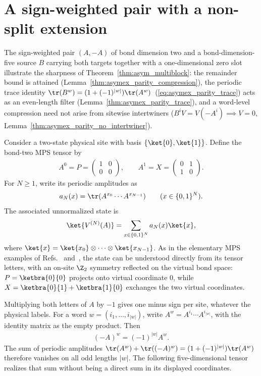 \section{A sign-weighted pair with a non-split extension}%
\label{sec:asymex_parity}

The sign-weighted pair $(A,-A)$ of bond dimension two and a bond-dimension-five
source $B$ carrying both targets together with a one-dimensional zero slot
illustrate the sharpness of Theorem~\ref{thm:asym_multiblock}: the remainder
bound is attained (Lemma~\ref{thm:asymex_parity_compression}), the periodic
trace identity $\tr(B^w)=(1+(-1)^{|w|})\tr(A^w)$~(\ref{eq:asymex_parity_trace})
acts as an even-length filter (Lemma~\ref{thm:asymex_parity_trace}), and a
word-level compression need not arise from sitewise intertwiners
($B^iV=V(-A^i)\implies V=0$, Lemma~\ref{thm:asymex_parity_no_intertwiner}).

Consider a two-state physical site with basis $\{\ket{0},\ket{1}\}$.
Define the bond-two MPS tensor by
\begin{align}
    A^0=P=\begin{pmatrix}1&0\\0&0\end{pmatrix},
    \qquad
    A^1=X=\begin{pmatrix}0&1\\1&0\end{pmatrix}.
    \label{eq:asymex_parity_letters}
\end{align}
For $N\geq1$, write its periodic amplitudes as
\begin{align}
    a_N(x)=\tr(A^{x_0}\cdots A^{x_{N-1}})
    \qquad (x\in\{0,1\}^N).
    \label{eq:asymex_parity_amplitudes}
\end{align}
The associated unnormalized state is
\begin{align}
    \ket{V^{(N)}(A)}
    =\sum_{x\in\{0,1\}^N}a_N(x)\ket{x},
    \label{eq:asymex_parity_state}
\end{align}
where $\ket{x}=\ket{x_0}\otimes\cdots\otimes\ket{x_{N-1}}$.
As in the elementary MPS examples of
Refs.~\cite[Section~II]{PerezGarcia2008StringOrder} and~\cite[Appendix~A]{Cirac2021Matrix},
the state can be understood directly from its tensor letters, with an on-site
$\Z_2$ symmetry reflected on the virtual bond space:
$P=\ketbra{0}{0}$ projects onto virtual coordinate $0$, while
$X=\ketbra{0}{1}+\ketbra{1}{0}$ exchanges the two virtual coordinates.

Multiplying both letters of $A$ by $-1$ gives one minus sign per
site, whatever the physical labels. For a word
$w=(i_1,\ldots,i_{|w|})$, write
$A^w=A^{i_1}\cdots A^{i_{|w|}}$, with the identity matrix as the
empty product. Then
\begin{align}
    (-A)^w=(-1)^{|w|}A^w.
    \label{eq:asymex_parity_weight}
\end{align}
The sum of periodic amplitudes
$\tr(A^w)+\tr((-A)^w)=(1+(-1)^{|w|})\tr(A^w)$ therefore vanishes on all odd
lengths $|w|$. The following five-dimensional tensor realizes that sum without
being a direct sum in its displayed coordinates.

